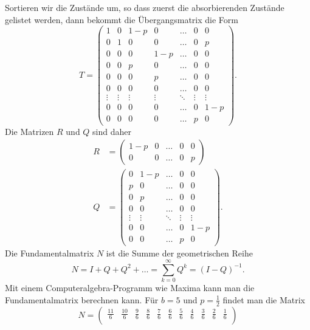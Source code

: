 \begin{loesung}
Sortieren wir die Zustände um, so dass zuerst die absorbierenden
Zustände gelistet werden, dann bekommt die Übergangsmatrix die Form
\[
T=\left(
\begin{array}{cc|ccccc}
   1   &   0   &  1-p  &   0   &\dots  &   0   &   0   \\
   0   &   1   &   0   &   0   &\dots  &   0   &   p   \\
\hline
   0   &   0   &   0   &  1-p  &\dots  &   0   &   0   \\
   0   &   0   &   p   &   0   &\dots  &   0   &   0   \\
   0   &   0   &   0   &   p   &\dots  &   0   &   0   \\
   0   &   0   &   0   &   0   &\dots  &   0   &   0   \\
\vdots &\vdots &\vdots &\vdots &\ddots &\vdots &\vdots \\
   0   &   0   &   0   &   0   &\dots  &   0   &  1-p  \\
   0   &   0   &   0   &   0   &\dots  &   p   &   0   
\end{array}
\right).
\]
Die Matrizen $R$ und $Q$ sind daher
\begin{align*}
R&=\begin{pmatrix}
  1-p  &   0   &\dots  &   0   &   0   \\
   0   &   0   &\dots  &   0   &   p   
\end{pmatrix}
\\
Q&=\begin{pmatrix}
   0   &  1-p  &\dots  &   0   &   0   \\
   p   &   0   &\dots  &   0   &   0   \\
   0   &   p   &\dots  &   0   &   0   \\
   0   &   0   &\dots  &   0   &   0   \\
\vdots &\vdots &\ddots &\vdots &\vdots \\
   0   &   0   &\dots  &   0   &  1-p  \\
   0   &   0   &\dots  &   p   &   0   
\end{pmatrix}.
\end{align*}
Die Fundamentalmatrix $N$ ist die Summe der geometrischen Reihe
\[
N = I + Q + Q^2 + \dots = \sum_{k=0}^\infty Q^k = (I-Q)^{-1}.
\]
Mit einem Computeralgebra-Programm wie Maxima kann man die Fundamentalmatrix
berechnen kann.
Für $b=5$ und $p=\frac12$ findet man die Matrix
\[
N=\begin{pmatrix}
\frac{11}{6}&\frac{10}{6}&\frac{9}{6}&\frac{8}{6}&\frac{7}{6}&\frac{6}{6}&\frac{5}{6}&\frac{4}{6}&\frac{3}{6}&\frac{2}{6}&\frac{1}{6}\\

\end{pmatrix}\]
\end{loesung}
